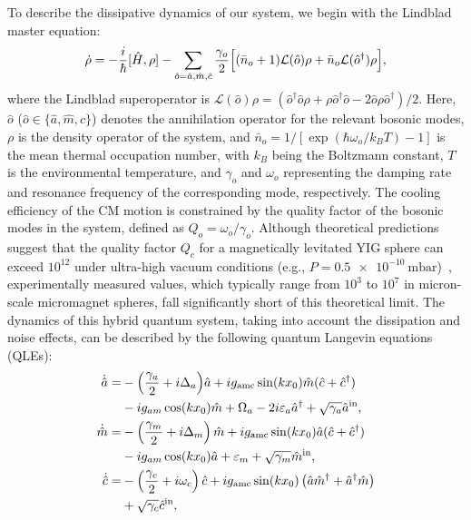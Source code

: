 \documentclass[aps, prresearch, reprint, nofootinbib, longbibliography]{revtex4-2}
\begin{document}
To describe the dissipative dynamics of our system, we begin with the Lindblad master equation:
\begin{equation}
\dot{\rho} = -\frac{i}{\hbar}[\hat{H}, \rho]
- \sum_{\hat{o} = \hat{a}, \hat{m}, \hat{c}} \frac{\gamma_o}{2}
\Bigl[ (\bar{n}_o + 1) \mathcal{L}(\hat{o}) \rho
+ \bar{n}_o \mathcal{L}(\hat{o}^\dagger) \rho \Bigr],
\label{eq:master_eq}
\end{equation}
where the Lindblad superoperator is \( \mathcal{L}(\hat{o})\rho = (\hat{o}^\dagger \hat{o}\rho + \rho \hat{o}^\dagger \hat{o} - 2\hat{o}\rho \hat{o}^\dagger)/2 \). Here, \( \hat{o} \) (\( \hat{o} \in \{\hat{a}, \hat{m}, \hat{c}\} \)) denotes the annihilation operator for the relevant bosonic modes, \( \rho \) is the density operator of the system, and \( \bar{n}_o = 1/[\exp(\hbar\omega_o/k_B T)-1] \) is the mean thermal occupation number, with \( k_B \) being the Boltzmann constant, \( T \) is the environmental temperature, and \( \gamma_o \) and \( \omega_o \) representing the damping rate and resonance frequency of the corresponding mode, respectively. The cooling efficiency of the CM motion is constrained by the quality factor of the bosonic modes in the system, defined as \( Q_o = \omega_o / \gamma_o \). Although theoretical predictions suggest that the quality factor \( Q_c \) for a magnetically levitated YIG sphere can exceed \( 10^{12} \) under ultra-high vacuum conditions (e.g., \( P = \SI{0.5e-10}{\milli\bar} \))~\cite{2013Thermal,12}, experimentally measured values, which typically range from \( 10^3 \) to \( 10^7 \) in micron-scale
micromagnet spheres, fall significantly short of this theoretical limit. 
The dynamics of this hybrid quantum system, taking into account the dissipation and noise effects, can be described by the following quantum Langevin equations (QLEs):
\begin{align}
	\dot{\hat{a}} = &-\Bigl(\frac{\gamma_a}{2} + i\Delta_a\Bigr)\hat{a} + i g_\text{amc} \sin(kx_0) \hat{m}(\hat{c} + \hat{c}^\dagger)  \nonumber \\
	& - i g_{am} \cos(kx_0) \hat{m} +\Omega_a - 2i \varepsilon_a \hat{a}^\dagger +\sqrt{\gamma_a} \hat{a}^{\text{in}}, \nonumber \\
	\dot{\hat{m}} = &-\left(\frac{\gamma_m}{2} + i\Delta_m\right)\hat{m} + i g_\text{amc} \sin(kx_0) \hat{a}(\hat{c} + \hat{c}^\dagger) \nonumber \\
	& - i g_{am} \cos(kx_0) \hat{a} +\varepsilon_m +\sqrt{\gamma_m} \hat{m}^{\text{in}}, \nonumber \\
	\dot{\hat{c}} = &-\left(\frac{\gamma_c}{2} + i\omega_c\right)\hat{c} + i g_\text{amc} \sin(kx_0)\left(\hat{a}\hat{m}^\dagger + \hat{a}^\dagger\hat{m}\right) \nonumber \\
	& +\sqrt{\gamma_c} \hat{c}^{\text{in}}, \label{QLE}
\end{align}
\end{document}
